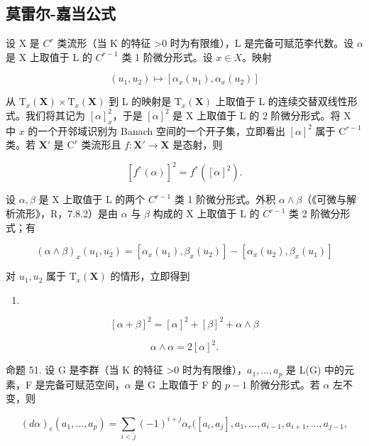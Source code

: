 \subsection{莫雷尔-嘉当公式}

设 X 是 \(C^{r}\) 类流形（当 K 的特征 \textgreater0 时为有限维），L 是完备可赋范李代数。设 \(\alpha\) 是 X 上取值于 L 的 \(C^{r-1}\) 类 1 阶微分形式。设 \(x \in X\)。映射

\[
(u _ {1}, u _ {2}) \mapsto [ \alpha_ {x} (u _ {1}), \alpha_ {x} (u _ {2}) ]
\]

从 \(\mathrm{T}_x(\mathbf{X})\times \mathrm{T}_x(\mathbf{X})\) 到 L 的映射是 \(\mathrm{T}_x(\mathbf{X})\) 上取值于 L 的连续交替双线性形式。我们将其记为 \([\alpha ]_x^2\)，于是 \([\alpha ]^2\) 是 X 上取值于 L 的 2 阶微分形式。将 X 中 \(x\) 的一个开邻域识别为 Banach 空间的一个开子集，立即看出 \([\alpha ]^2\) 属于 \(\mathrm{C}^{r - 1}\) 类。若 \(\mathbf{X}'\) 是 \(\mathrm{C}^r\) 类流形且 \(f\colon \mathbf{X}'\to \mathbf{X}\) 是态射，则

\[
[ f ^ {*} (\alpha) ] ^ {2} = f ^ {*} ([ \alpha ] ^ {2}).\tag{28}
\]

设 \(\alpha, \beta\) 是 X 上取值于 L 的两个 \(C^{r-1}\) 类 1 阶微分形式。外积 \(\alpha \wedge \beta\)（《可微与解析流形》，R，7.8.2）是由 \(\alpha\) 与 \(\beta\) 构成的 X 上取值于 L 的 \(C^{r-1}\) 类 2 阶微分形式；有

\[
(\alpha \wedge \beta) _ {x} (u _ {1}, u _ {2}) = [ \alpha_ {x} (u _ {1}), \beta_ {x} (u _ {2}) ] - [ \alpha_ {x} (u _ {2}), \beta_ {x} (u _ {1}) ]\tag{29}
\]

对 \(u_{1}, u_{2}\) 属于 \(\mathrm{T}_x(\mathbf{X})\) 的情形，立即得到

\begin{enumerate}
\def\labelenumi{(\arabic{enumi})}
\setcounter{enumi}{29}
\tightlist
\item
\end{enumerate}

\[
[ \alpha + \beta ] ^ {2} = [ \alpha ] ^ {2} + [ \beta ] ^ {2} + \alpha \wedge \beta\tag{31}
\]

\[
\alpha \wedge \alpha = 2 [ \alpha ] ^ {2}.
\]

命题 51. 设 G 是李群（当 K 的特征 \textgreater0 时为有限维），\(a_{1},\ldots,a_{p}\) 是 L(G) 中的元素，F 是完备可赋范空间，\(\alpha\) 是 G 上取值于 F 的 \(p-1\) 阶微分形式。若 \(\alpha\) 左不变，则

\[
(d \alpha) _ {e} (a _ {1}, \dots , a _ {p}) = \sum_ {i <   j} (- 1) ^ {i + j} \alpha_ {e} ([ a _ {i}, a _ {j} ], a _ {1}, \dots , a _ {i - 1}, a _ {i + 1}, \dots , a _ {j - 1},
\]

